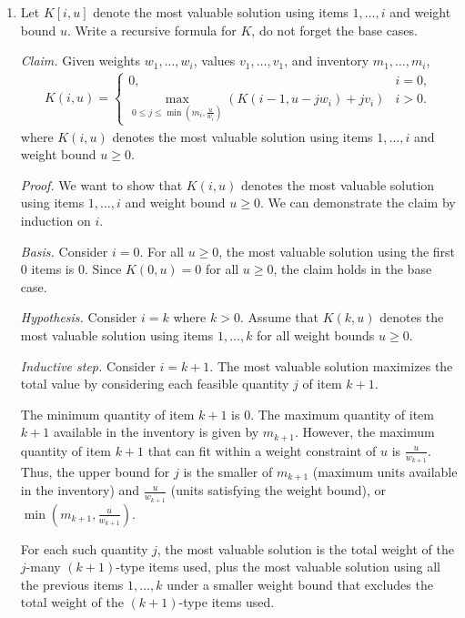 \begin{enumerate}
    \item Let $K[i,u]$ denote the most valuable solution using items $1,\ldots,i$ and weight bound $u$. Write a recursive formula for $K$, do not forget the base cases.

\begin{solution}
\textit{Claim. }Given weights $w_1,\dots,w_i$, values $v_1,\dots,v_1$, and inventory $m_1,\dots,m_i$,
\begin{align*}
K(i,u)=\begin{cases}
0,&i=0,\\
{\underset{0\leq j\leq\min\left(m_i,\frac{u}{w_i}\right)}{\max}}\left(K(i-1,u-jw_i)+jv_i\right)&i>0.
\end{cases}
\end{align*}
where $K(i,u)$ denotes the most valuable solution using items $1,\dots,i$ and weight bound $u\geq 0$. 

\textit{Proof. }We want to show that $K(i,u)$ denotes the most valuable solution using items $1,\dots,i$ and weight bound $u\geq 0$. We can demonstrate the claim by induction on $i$.

\textit{Basis. }Consider $i=0$. For all $u\geq 0$, the most valuable solution using the first $0$ items is $0$. Since $K(0,u)=0$ for all $u\geq 0$, the claim holds in the base case.

\textit{Hypothesis. }Consider $i=k$ where $k>0$. Assume that $K(k,u)$ denotes the most valuable solution using items $1,\dots,k$ for all weight bounds $u\geq 0$.

\textit{Inductive step. }Consider $i=k+1$. The most valuable solution maximizes the total value by considering each feasible quantity $j$ of item $k+1$.

The minimum quantity of item $k+1$ is $0$. The maximum quantity of item $k+1$ available in the inventory is given by $m_{k+1}$. However, the maximum quantity of item $k+1$ that can fit within a weight constraint of $u$ is $\frac{u}{w_{k+1}}$. Thus, the upper bound for $j$ is the smaller of $m_{k+1}$ (maximum units available in the inventory) and $\frac{u}{w_{k+1}}$ (units satisfying the weight bound), or $\min\left(m_{k+1},\frac{u}{w_{k+1}}\right)$.

For each such quantity $j$, the most valuable solution is the total weight of the $j$-many $(k+1)$-type items used, plus the most valuable solution using all the previous items $1,\dots,k$ under a smaller weight bound that excludes the total weight of the $(k+1)$-type items used. 


\end{solution}
\end{enumerate}
